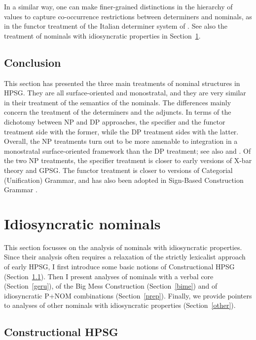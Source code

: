 \documentclass[output=paper
	        ,collection
	        ,collectionchapter
 	        ,biblatex
                ,babelshorthands
                ,newtxmath
                ,draftmode
                ,colorlinks, citecolor=brown
]{langscibook}
\begin{document}
In a similar way, one can make finer-grained distinctions in the hierarchy of  
 values to capture co-occurrence restrictions between determiners and 
nominals, as in the functor treatment of the Italian determiner system of 
\citet{Allegranza06}. See also the treatment of nominals with idiosyncratic properties 
in Section~\ref{idio}. 


\subsection{Conclusion} 


This section has presented the three main treatments of nominal structures in HPSG. 
They are all surface-oriented and monostratal, and they are very similar in their 
treatment of the semantics of the nominals. 
The differences mainly concern the treatment of the determiners and the adjuncts. 
In terms of the dichotomy between NP and DP approaches, the specifier and the functor 
treatment side with the former, while the DP treatment sides with the latter. 
Overall, the NP treatments turn out to be more amenable to integration  
in a monostratal surface-oriented framework than the DP treatment; see also \citet{MuellerHeadless}
and \citet{VanEynde2020}. Of the two NP treatments,
the specifier treatment is closer to early versions of X-bar theory and GPSG.   
The functor treatment is closer to versions of Categorial (Unification) Grammar, and 
has also been adopted in Sign-Based Construction Grammar \citep[155--157]{Sag2012}.

 

\section{Idiosyncratic nominals}
\label{idio}


This section focusses on the analysis of nominals with idiosyncratic properties. 
Since their analysis often requires a relaxation of the strictly lexicalist approach 
of early HPSG, I first introduce some basic notions of Constructional HPSG (Section~\ref{cohp}). 
Then I present analyses of nominals with a verbal core (Section~\ref{geru}), 
of the Big Mess Construction (Section~\ref{bime}) and of idiosyncratic P+NOM combinations 
(Section~\ref{prep}). Finally, we provide pointers to analyses of other nominals with 
idiosyncratic properties (Section~\ref{other}). 


\subsection{Constructional HPSG} 
\label{cohp}
\end{document}
